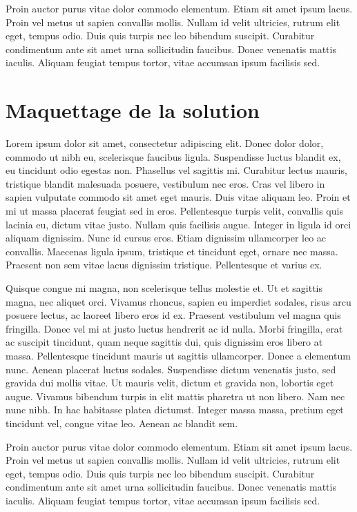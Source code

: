 \documentclass[a4paper,12pt]{report}
\begin{document}
Proin auctor purus vitae dolor commodo elementum. Etiam sit amet ipsum lacus. Proin vel metus ut sapien convallis mollis. Nullam id velit ultricies, rutrum elit eget, tempus odio. Duis quis turpis nec leo bibendum suscipit. Curabitur condimentum ante sit amet urna sollicitudin faucibus. Donec venenatis mattis iaculis. Aliquam feugiat tempus tortor, vitae accumsan ipsum facilisis sed.


\section{Maquettage de la solution} %
Lorem ipsum dolor sit amet, consectetur adipiscing elit. Donec dolor dolor, commodo ut nibh eu, scelerisque faucibus ligula. Suspendisse luctus blandit ex, eu tincidunt odio egestas non. Phasellus vel sagittis mi. Curabitur lectus mauris, tristique blandit malesuada posuere, vestibulum nec eros. Cras vel libero in sapien vulputate commodo sit amet eget mauris. Duis vitae aliquam leo. Proin et mi ut massa placerat feugiat sed in eros. Pellentesque turpis velit, convallis quis lacinia eu, dictum vitae justo. Nullam quis facilisis augue. Integer in ligula id orci aliquam dignissim. Nunc id cursus eros. Etiam dignissim ullamcorper leo ac convallis. Maecenas ligula ipsum, tristique et tincidunt eget, ornare nec massa. Praesent non sem vitae lacus dignissim tristique. Pellentesque et varius ex.

Quisque congue mi magna, non scelerisque tellus molestie et. Ut et sagittis magna, nec aliquet orci. Vivamus rhoncus, sapien eu imperdiet sodales, risus arcu posuere lectus, ac laoreet libero eros id ex. Praesent vestibulum vel magna quis fringilla. Donec vel mi at justo luctus hendrerit ac id nulla. Morbi fringilla, erat ac suscipit tincidunt, quam neque sagittis dui, quis dignissim eros libero at massa. Pellentesque tincidunt mauris ut sagittis ullamcorper. Donec a elementum nunc. Aenean placerat luctus sodales. Suspendisse dictum venenatis justo, sed gravida dui mollis vitae. Ut mauris velit, dictum et gravida non, lobortis eget augue. Vivamus bibendum turpis in elit mattis pharetra ut non libero. Nam nec nunc nibh. In hac habitasse platea dictumst. Integer massa massa, pretium eget tincidunt vel, congue vitae leo. Aenean ac blandit sem.

Proin auctor purus vitae dolor commodo elementum. Etiam sit amet ipsum lacus. Proin vel metus ut sapien convallis mollis. Nullam id velit ultricies, rutrum elit eget, tempus odio. Duis quis turpis nec leo bibendum suscipit. Curabitur condimentum ante sit amet urna sollicitudin faucibus. Donec venenatis mattis iaculis. Aliquam feugiat tempus tortor, vitae accumsan ipsum facilisis sed.
\end{document}
